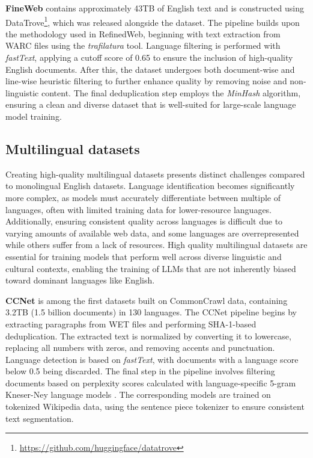 \textbf{FineWeb} \cite{penedo_kydlicek_etal2024} contains approximately 43TB of 
English text and is constructed using 
DataTrove\footnote{\url{https://github.com/huggingface/datatrove}}, which 
was released alongside the dataset.
The pipeline builds upon the methodology used in RefinedWeb, beginning with text 
extraction from WARC files using the \textit{trafilatura} tool. 
Language filtering is performed with \textit{fastText}, applying a cutoff score 
of 0.65 to ensure the inclusion of high-quality English documents. After this, the 
dataset undergoes both document-wise and line-wise heuristic filtering to further
enhance quality by removing noise and non-linguistic content. The final deduplication 
step employs the \textit{MinHash} algorithm, ensuring a clean and diverse dataset that 
is well-suited for large-scale language model training.


\subsection{Multilingual datasets}
\label{sec:rel_work.multi}

Creating high-quality multilingual datasets presents distinct challenges compared to 
monolingual English datasets. Language identification becomes significantly more complex, 
as models must accurately differentiate between multiple
of languages, often with limited training data for lower-resource languages. Additionally, 
ensuring consistent quality across languages is difficult due to varying amounts of available 
web data, and some languages are overrepresented while others suffer from a lack of resources. 
High quality multilingual datasets are essential for training models that perform well across 
diverse linguistic and cultural contexts, enabling the training of LLMs that are 
not inherently biased toward dominant languages like English.

\textbf{CCNet} \cite{wenzek_lachaux_etal2019} is among the first datasets built on CommonCrawl data,
containing 3.2TB (1.5 billion documents) in 130 languages. The CCNet pipeline begins 
by extracting paragraphs from WET files and performing SHA-1-based deduplication. The 
extracted text is normalized by converting it to lowercase, replacing all numbers with 
zeros, and removing accents and punctuation.
Language detection is based on \textit{fastText}, with documents with a language score below 0.5  being 
discarded. The final step in the pipeline involves filtering documents based on 
perplexity scores calculated with language-specific 5-gram Kneser-Ney language 
models \cite{heafield2011}. The corresponding models are trained on tokenized Wikipedia 
data, using the sentence piece tokenizer \cite{kudo2018} to ensure consistent text segmentation.


